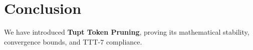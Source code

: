 \section{Conclusion}
We have introduced \textbf{Tupt Token Pruning}, proving its mathematical stability, convergence bounds, and TTT-7 compliance.